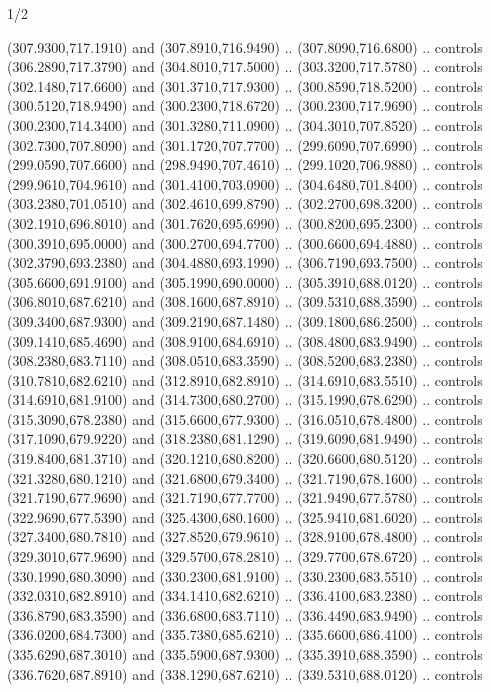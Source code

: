 \begin{flagdescription}{1/2}
\begin{scope}[xshift=0.5\flaglength]
\begin{scope}[scale=0.00745\flagwidth,xshift=-12.1mm,yshift=41.7mm]
\begin{scope}[y=0.80pt, x=0.80pt, yscale=-1, xscale=1, inner sep=0pt, outer sep=0pt]
\begin{scope}[cm={{1.33333,0.0,0.0,-1.33333,(0.0,114.66667)}}]
\begin{scope}[scale=0.100]
  (307.9300,717.1910) and (307.8910,716.9490) .. (307.8090,716.6800) .. controls
  (306.2890,717.3790) and (304.8010,717.5000) .. (303.3200,717.5780) .. controls
  (302.1480,717.6600) and (301.3710,717.9300) .. (300.8590,718.5200) .. controls
  (300.5120,718.9490) and (300.2300,718.6720) .. (300.2300,717.9690) .. controls
  (300.2300,714.3400) and (301.3280,711.0900) .. (304.3010,707.8520) .. controls
  (302.7300,707.8090) and (301.1720,707.7700) .. (299.6090,707.6990) .. controls
  (299.0590,707.6600) and (298.9490,707.4610) .. (299.1020,706.9880) .. controls
  (299.9610,704.9610) and (301.4100,703.0900) .. (304.6480,701.8400) .. controls
  (303.2380,701.0510) and (302.4610,699.8790) .. (302.2700,698.3200) .. controls
  (302.1910,696.8010) and (301.7620,695.6990) .. (300.8200,695.2300) .. controls
  (300.3910,695.0000) and (300.2700,694.7700) .. (300.6600,694.4880) .. controls
  (302.3790,693.2380) and (304.4880,693.1990) .. (306.7190,693.7500) .. controls
  (305.6600,691.9100) and (305.1990,690.0000) .. (305.3910,688.0120) .. controls
  (306.8010,687.6210) and (308.1600,687.8910) .. (309.5310,688.3590) .. controls
  (309.3400,687.9300) and (309.2190,687.1480) .. (309.1800,686.2500) .. controls
  (309.1410,685.4690) and (308.9100,684.6910) .. (308.4800,683.9490) .. controls
  (308.2380,683.7110) and (308.0510,683.3590) .. (308.5200,683.2380) .. controls
  (310.7810,682.6210) and (312.8910,682.8910) .. (314.6910,683.5510) .. controls
  (314.6910,681.9100) and (314.7300,680.2700) .. (315.1990,678.6290) .. controls
  (315.3090,678.2380) and (315.6600,677.9300) .. (316.0510,678.4800) .. controls
  (317.1090,679.9220) and (318.2380,681.1290) .. (319.6090,681.9490) .. controls
  (319.8400,681.3710) and (320.1210,680.8200) .. (320.6600,680.5120) .. controls
  (321.3280,680.1210) and (321.6800,679.3400) .. (321.7190,678.1600) .. controls
  (321.7190,677.9690) and (321.7190,677.7700) .. (321.9490,677.5780) .. controls
  (322.9690,677.5390) and (325.4300,680.1600) .. (325.9410,681.6020) .. controls
  (327.3400,680.7810) and (327.8520,679.9610) .. (328.9100,678.4800) .. controls
  (329.3010,677.9690) and (329.5700,678.2810) .. (329.7700,678.6720) .. controls
  (330.1990,680.3090) and (330.2300,681.9100) .. (330.2300,683.5510) .. controls
  (332.0310,682.8910) and (334.1410,682.6210) .. (336.4100,683.2380) .. controls
  (336.8790,683.3590) and (336.6800,683.7110) .. (336.4490,683.9490) .. controls
  (336.0200,684.7300) and (335.7380,685.6210) .. (335.6600,686.4100) .. controls
  (335.6290,687.3010) and (335.5900,687.9300) .. (335.3910,688.3590) .. controls
  (336.7620,687.8910) and (338.1290,687.6210) .. (339.5310,688.0120) .. controls

\end{scope}
\end{scope}
\end{scope}
\end{scope}
\end{scope}
\end{flagdescription}

